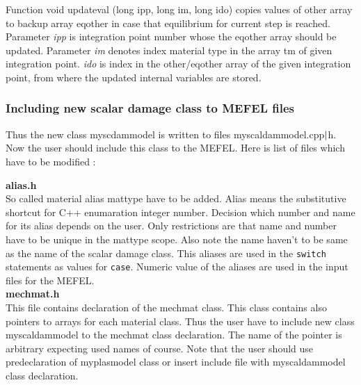 Function {\sf void updateval (long ipp, long im, long ido)} copies values of {\sf other} array to 
backup array {\sf eqother} in case that equilibrium for current step is reached. 
Parameter {\it ipp} is integration point number whose the {\sf eqother} array should be updated.
Parameter {\it im} denotes index material type in the array {\sf tm} of given integration point. 
{\it ido} is index in the {\sf other/eqother} array of the given integration point, from where the 
updated internal variables are stored.


\subsubsection {Including new scalar damage class to MEFEL files}
Thus the new class {\sf myscdammodel} is written to files myscaldammodel.cpp${\rm |}$h. 
Now the user should include this class to the MEFEL. Here is list of files which have to 
be modified :

{\bf alias.h}\\
So called material alias {\sf mattype} have to be added. Alias means the substitutive shortcut
for C++ enumaration integer number. Decision which number and name for its alias depends on the user.
Only restrictions are that name and number have to be unique in the {\sf mattype} scope. Also note
the name haven't to be same as the name of the scalar damage class. This aliases are used in the
{\tt switch} statements as values for {\tt case}. Numeric value of the aliases are used in the input
files for the MEFEL.\\

{\bf mechmat.h}\\
This file contains declaration of the {\sf mechmat} class. This class contains also pointers to arrays for each
material class. Thus the user have to include new class {\sf myscaldammodel} to the {\sf mechmat} class declaration.
The name of the pointer is arbitrary expecting used names of course. Note that the user should use predeclaration
of {\sf myplasmodel} class or insert include file with {\sf myscaldammodel} class declaration.\\


